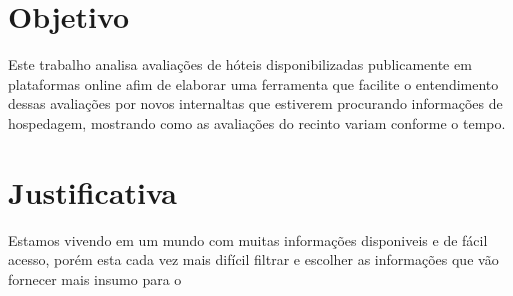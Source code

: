 \section{Objetivo}

Este trabalho analisa avaliações de hóteis disponibilizadas publicamente em plataformas online afim de elaborar uma ferramenta que facilite o entendimento dessas avaliações por novos internaltas que estiverem procurando informações de hospedagem, mostrando como as avaliações do recinto variam conforme o tempo. 

\begin{comment}
    como o sentimento dos usuários que avaliaram o estabelecimento variou durante o tempo, se o recinto está recebendo avaliações com sentimentos mais positivos ou se a tendência é de que as avaliações continuem com sentimentos cada vez mais negativos, e identificiar possíveis mudanças de comportamento, que para esses cenários podem ser justificados por mudanças de equipe, mudanças de políticas internas da empresa ou por uma simples manutenção ou evolução das instalações
    , afim de observar e entender as variações de sentimentos das avaliações realizadas pelos usuários da plataforma distribuidos durante o tempo.
\end{comment}

\section{Justificativa}

Estamos vivendo em um mundo com muitas informações disponiveis e de fácil acesso, porém esta cada vez mais difícil filtrar e escolher as informações que vão fornecer mais insumo para o 